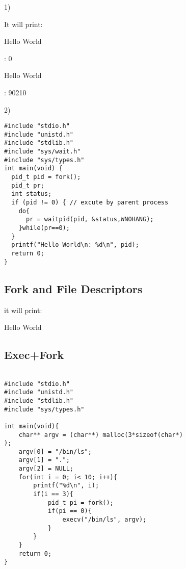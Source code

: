 \documentclass[utf-8]{ctexart}
\begin{document}
1)

It will print:

Hello World

:  0

Hello World

:  90210

2)

\begin{verbatim}
#include "stdio.h"
#include "unistd.h"
#include "stdlib.h"
#include "sys/wait.h"
#include "sys/types.h"
int main(void) {
  pid_t pid = fork();
  pid_t pr;
  int status;
  if (pid != 0) { // excute by parent process
    do{
      pr = waitpid(pid, &status,WNOHANG);
    }while(pr==0);
  }
  printf("Hello World\n: %d\n", pid);
  return 0;
}
\end{verbatim}

\subsection{Fork and File Descriptors}
\label{sec:3.6}

it will print:

Hello World

\subsection{Exec+Fork}
\label{sec:3.8}

\begin{verbatim}

#include "stdio.h"
#include "unistd.h"
#include "stdlib.h"
#include "sys/types.h"

int main(void){
    char** argv = (char**) malloc(3*sizeof(char*)
);
    argv[0] = "/bin/ls";
    argv[1] = ".";
    argv[2] = NULL;
    for(int i = 0; i< 10; i++){
        printf("%d\n", i);
        if(i == 3){
            pid_t pi = fork();
            if(pi == 0){
                execv("/bin/ls", argv);
            }
        }
    }
    return 0;
}

\end{verbatim}
\end{document}
